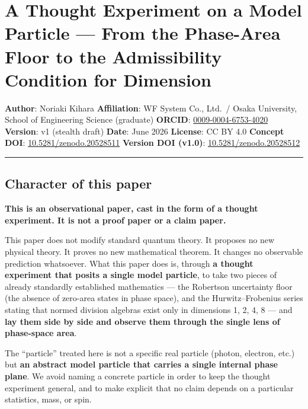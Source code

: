 \documentclass[
]{article}
\author{}
\date{}
\begin{document}
\section{A Thought Experiment on a Model Particle --- From the
Phase-Area Floor to the Admissibility Condition for
Dimension}\label{a-thought-experiment-on-a-model-particle-from-the-phase-area-floor-to-the-admissibility-condition-for-dimension}

\textbf{Author}: Noriaki Kihara \textbf{Affiliation}: WF System Co.,
Ltd.~/ Osaka University, School of Engineering Science (graduate)
\textbf{ORCID}:
\href{https://orcid.org/0009-0004-6753-4020}{0009-0004-6753-4020}
\textbf{Version}: v1 (stealth draft) \textbf{Date}: June 2026
\textbf{License}: CC BY 4.0 \textbf{Concept DOI}:
\href{https://doi.org/10.5281/zenodo.20528511}{10.5281/zenodo.20528511}
\textbf{Version DOI (v1.0)}:
\href{https://doi.org/10.5281/zenodo.20528512}{10.5281/zenodo.20528512}

\begin{center}\rule{0.5\linewidth}{0.5pt}\end{center}

\subsection{Character of this paper}\label{character-of-this-paper}

\textbf{This is an observational paper, cast in the form of a thought
experiment. It is not a proof paper or a claim paper.}

This paper does not modify standard quantum theory. It proposes no new
physical theory. It proves no new mathematical theorem. It changes no
observable prediction whatsoever. What this paper does is, through
\textbf{a thought experiment that posits a single model particle}, to
take two pieces of already standardly established mathematics --- the
Robertson uncertainty floor (the absence of zero-area states in phase
space), and the Hurwitz--Frobenius series stating that normed division
algebras exist only in dimensions 1, 2, 4, 8 --- and \textbf{lay them
side by side and observe them through the single lens of phase-space
area}.

The ``particle'' treated here is not a specific real particle (photon,
electron, etc.) but \textbf{an abstract model particle that carries a
single internal phase plane}. We avoid naming a concrete particle in
order to keep the thought experiment general, and to make explicit that
no claim depends on a particular statistics, mass, or spin.
\end{document}
